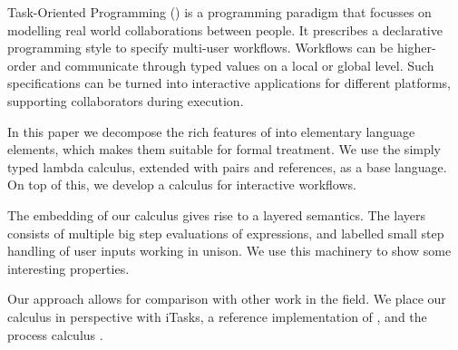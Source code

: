 
Task-Oriented Programming (\TOP) is a programming paradigm that focusses on modelling real world collaborations between people.
It prescribes a declarative programming style to specify multi-user workflows.
Workflows can be higher-order and communicate through typed values on a local or global level.
Such specifications can be turned into interactive applications for different platforms,
supporting collaborators during execution.

In this paper we decompose the rich features of \TOP into elementary language elements,
which makes them suitable for formal treatment.
We use the simply typed lambda calculus, extended with pairs and references, as a base language.
On top of this, we develop a calculus for interactive workflows.

The embedding of our calculus gives rise to a layered semantics.
The layers consists of multiple big step evaluations of expressions,
and labelled small step handling of user inputs working in unison.
We use this machinery to show some interesting properties.

Our approach allows for comparison with other work in the field.
We place our calculus in perspective with iTasks, a reference implementation of \TOP,
and the process calculus \CSP.
